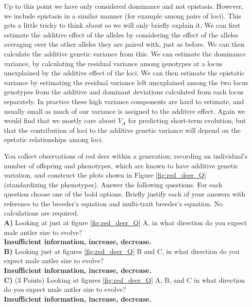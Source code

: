 Up to this point we have only considered
dominance and not epistasis. However, we include epistasis in a
similar manner (for example among pairs of loci). This gets a little
tricky to think about so we will only briefly explain it. 
 We can first estimate the additive effect of the
alleles by considering the effect of the alleles averaging over the
other alleles they are paired with, just as before. We can then
calculate the additive genetic variance from this. We can estimate
the dominance variance, by calculating the residual variance among
genotypes at a locus unexplained by the additive effect of the
loci. We can then estimate the epistatic variance by estimating the
residual variance left unexplained among the two locus genotypes from the additive and dominant
deviations calculated from each locus separately. In practice these
high variance components are hard to estimate, and usually small as
much of our variance is assigned to the additive effect.  Again we
would find that we mostly care about $V_A$ for predicting short-term
evolution, but that the contribution of loci to the additive genetic
variance will depend on the epstatic relationships among loci.


\begin{question}
You collect observations of red deer within a generation; recording an
individual’s number of offspring and phenotypes, which are known to
have additive genetic variation, and construct the plots shown in
Figure \ref{fig:red_deer_Q} (standardizing the phenotypes). Answer the following
questions. For each question choose one of the bold options. Briefly justify each of your answers with reference to the breeder's
equation and multi-trait breeder's equation. No calculations are required. \\
{\bf A)}	Looking at just at figure \ref{fig:red_deer_Q} A, in what direction do you expect male antler size to evolve? \\
{\bf Insufficient information, increase, decrease.}\\

{\bf B)}	Looking just at figures \ref{fig:red_deer_Q} B and C, in what direction do you expect male antler size to evolve? \\
{\bf Insufficient information, increase, decrease.}\\

{\bf C)}	(3 Points) Looking at figures \ref{fig:red_deer_Q} A, B, and C in what direction do you expect male antler size to evolve? \\
{\bf Insufficient information, increase, decrease.}\\
\end{question}

